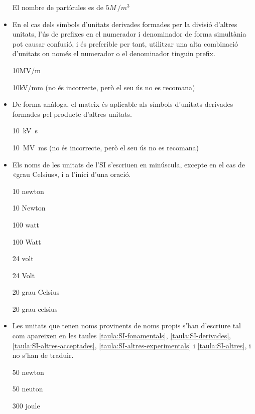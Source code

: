 \begin{itemize}
\textcolor{Red}\faTimesCircle{} El nombre de partícules es de $5 \unit{M\,/m^3}$


\item En el cas dels símbols d'unitats derivades formades per la divisió
d'altres unitats, l'ús de prefixes en el numerador i denominador de
forma simultània pot causar confusió, i és preferible per tant,
utilitzar una alta combinació d'unitats on només el numerador o el
denominador tinguin prefix.

\textcolor{Green}\faCheckSquare{} 10\unit{MV/m}

\textcolor{Red}\faTimesCircle{}  10\unit{kV/mm}  (no és incorrecte, però el seu ús no es recomana)


\item De forma anàloga, el mateix és aplicable als símbols d'unitats
derivades formades pel producte d'altres unitats.

\textcolor{Green}\faCheckSquare{} \SI{10}{kV.s}

\textcolor{Red}\faTimesCircle{}  \SI{10}{MV.ms}  (no és incorrecte, però el seu ús no es recomana)


\item Els noms de les unitats de l'SI s'escriuen en minúscula, excepte en
el cas de «grau Celsius», i a l'inici d'una oració.

\textcolor{Green}\faCheckSquare{} 10 newton

\textcolor{Red}\faTimesCircle{} 10 Newton

\textcolor{Green}\faCheckSquare{}  100 watt

\textcolor{Red}\faTimesCircle{} 100 Watt

\textcolor{Green}\faCheckSquare{}  24 volt

\textcolor{Red}\faTimesCircle{} 24 Volt

\textcolor{Green}\faCheckSquare{}  20 grau Celsius

\textcolor{Red}\faTimesCircle{} 20 grau celsius


\item Les unitats que tenen noms provinents de noms propis s'han
d'escriure tal com apareixen en les taules
\vref{taula:SI-fonamentals}, \vref{taula:SI-derivades}, \vref{taula:SI-altres-acceptades}, \vref{taula:SI-altres-experimentals} i \vref{taula:SI-altres}, i no s'han
de traduir.

\textcolor{Green}\faCheckSquare{} 50 newton

\textcolor{Red}\faTimesCircle{}  50 neuton

\textcolor{Green}\faCheckSquare{} 300 joule


\end{itemize}
